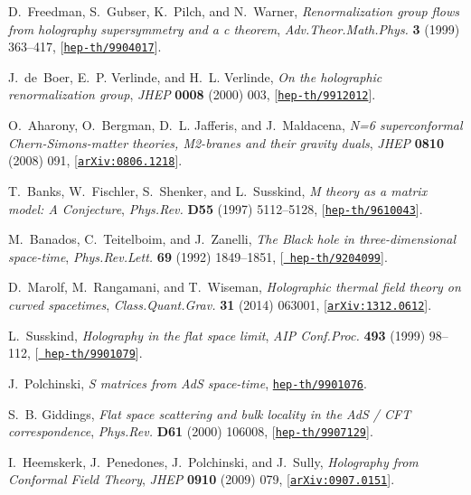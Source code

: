\documentclass[12pt]{article}
\begin{document}
\begin{thebibliography}{100}
D.~Freedman, S.~Gubser, K.~Pilch, and N.~Warner, {\it {Renormalization group
  flows from holography supersymmetry and a c theorem}},  {\em
  Adv.Theor.Math.Phys.} {\bf 3} (1999) 363--417,
  [\href{http://xxx.lanl.gov/abs/hep-th/9904017}{{\tt hep-th/9904017}}].

J.~de~Boer, E.~P. Verlinde, and H.~L. Verlinde, {\it {On the holographic
  renormalization group}},  {\em JHEP} {\bf 0008} (2000) 003,
  [\href{http://xxx.lanl.gov/abs/hep-th/9912012}{{\tt hep-th/9912012}}].

O.~Aharony, O.~Bergman, D.~L. Jafferis, and J.~Maldacena, {\it {N=6
  superconformal Chern-Simons-matter theories, M2-branes and their gravity
  duals}},  {\em JHEP} {\bf 0810} (2008) 091,
  [\href{http://xxx.lanl.gov/abs/0806.1218}{{\tt arXiv:0806.1218}}].

T.~Banks, W.~Fischler, S.~Shenker, and L.~Susskind, {\it {M theory as a matrix
  model: A Conjecture}},  {\em Phys.Rev.} {\bf D55} (1997) 5112--5128,
  [\href{http://xxx.lanl.gov/abs/hep-th/9610043}{{\tt hep-th/9610043}}].

M.~Banados, C.~Teitelboim, and J.~Zanelli, {\it {The Black hole in
  three-dimensional space-time}},  {\em Phys.Rev.Lett.} {\bf 69} (1992)
  1849--1851, [\href{http://xxx.lanl.gov/abs/hep-th/9204099}{{\tt
  hep-th/9204099}}].

D.~Marolf, M.~Rangamani, and T.~Wiseman, {\it {Holographic thermal field theory
  on curved spacetimes}},  {\em Class.Quant.Grav.} {\bf 31} (2014) 063001,
  [\href{http://xxx.lanl.gov/abs/1312.0612}{{\tt arXiv:1312.0612}}].

L.~Susskind, {\it {Holography in the flat space limit}},  {\em AIP Conf.Proc.}
  {\bf 493} (1999) 98--112, [\href{http://xxx.lanl.gov/abs/hep-th/9901079}{{\tt
  hep-th/9901079}}].

J.~Polchinski, {\it {S matrices from AdS space-time}},
  \href{http://xxx.lanl.gov/abs/hep-th/9901076}{{\tt hep-th/9901076}}.

S.~B. Giddings, {\it {Flat space scattering and bulk locality in the AdS / CFT
  correspondence}},  {\em Phys.Rev.} {\bf D61} (2000) 106008,
  [\href{http://xxx.lanl.gov/abs/hep-th/9907129}{{\tt hep-th/9907129}}].

I.~Heemskerk, J.~Penedones, J.~Polchinski, and J.~Sully, {\it {Holography from
  Conformal Field Theory}},  {\em JHEP} {\bf 0910} (2009) 079,
  [\href{http://xxx.lanl.gov/abs/0907.0151}{{\tt arXiv:0907.0151}}].


\end{thebibliography}
\end{document}
